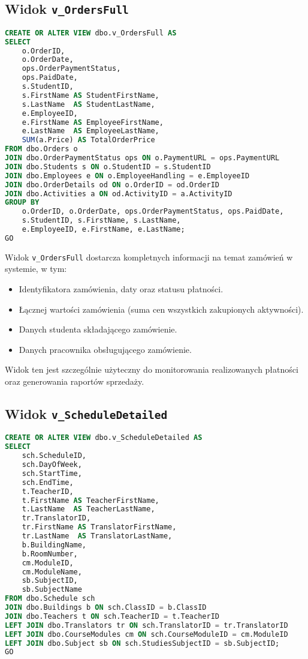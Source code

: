 \documentclass[12pt]{article}
\begin{document}
\subsection{Widok \texttt{v\_OrdersFull}}

\begin{lstlisting}[language=SQL]
CREATE OR ALTER VIEW dbo.v_OrdersFull AS
SELECT
    o.OrderID,
    o.OrderDate,
    ops.OrderPaymentStatus,
    ops.PaidDate,
    s.StudentID,
    s.FirstName AS StudentFirstName,
    s.LastName  AS StudentLastName,
    e.EmployeeID,
    e.FirstName AS EmployeeFirstName,
    e.LastName  AS EmployeeLastName,
    SUM(a.Price) AS TotalOrderPrice
FROM dbo.Orders o
JOIN dbo.OrderPaymentStatus ops ON o.PaymentURL = ops.PaymentURL
JOIN dbo.Students s ON o.StudentID = s.StudentID
JOIN dbo.Employees e ON o.EmployeeHandling = e.EmployeeID
JOIN dbo.OrderDetails od ON o.OrderID = od.OrderID
JOIN dbo.Activities a ON od.ActivityID = a.ActivityID
GROUP BY
    o.OrderID, o.OrderDate, ops.OrderPaymentStatus, ops.PaidDate,
    s.StudentID, s.FirstName, s.LastName,
    e.EmployeeID, e.FirstName, e.LastName;
GO
\end{lstlisting}

\noindent Widok \texttt{v\_OrdersFull} dostarcza kompletnych informacji na temat zamówień w systemie, w tym:
\begin{itemize}
    \item Identyfikatora zamówienia, daty oraz statusu płatności.
    \item Łącznej wartości zamówienia (suma cen wszystkich zakupionych aktywności).
    \item Danych studenta składającego zamówienie.
    \item Danych pracownika obsługującego zamówienie.
\end{itemize}
\noindent Widok ten jest szczególnie użyteczny do monitorowania realizowanych płatności oraz generowania raportów sprzedaży.


\subsection{Widok \texttt{v\_ScheduleDetailed}}

\begin{lstlisting}[language=SQL]
CREATE OR ALTER VIEW dbo.v_ScheduleDetailed AS
SELECT
    sch.ScheduleID,
    sch.DayOfWeek,
    sch.StartTime,
    sch.EndTime,
    t.TeacherID,
    t.FirstName AS TeacherFirstName,
    t.LastName  AS TeacherLastName,
    tr.TranslatorID,
    tr.FirstName AS TranslatorFirstName,
    tr.LastName  AS TranslatorLastName,
    b.BuildingName,
    b.RoomNumber,
    cm.ModuleID,
    cm.ModuleName,
    sb.SubjectID,
    sb.SubjectName
FROM dbo.Schedule sch
JOIN dbo.Buildings b ON sch.ClassID = b.ClassID
JOIN dbo.Teachers t ON sch.TeacherID = t.TeacherID
LEFT JOIN dbo.Translators tr ON sch.TranslatorID = tr.TranslatorID
LEFT JOIN dbo.CourseModules cm ON sch.CourseModuleID = cm.ModuleID
LEFT JOIN dbo.Subject sb ON sch.StudiesSubjectID = sb.SubjectID;
GO
\end{lstlisting}
\end{document}
